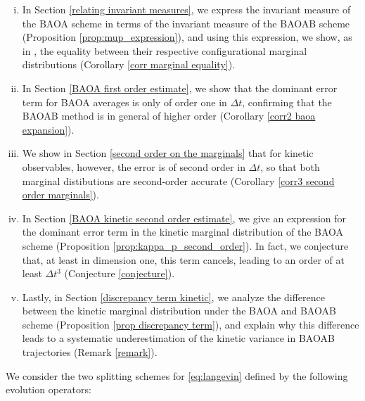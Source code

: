 \begin{enumerate}[(i)]
  \item In Section \ref{relating invariant measures}, we express the invariant measure of the BAOA scheme in terms of the invariant measure of the BAOAB scheme (Proposition \ref{prop:mup_expression}), and using this expression, we show, as in \cite[Section II.C]{KK22}, the equality between their respective configurational marginal distributions (Corollary \ref{corr marginal equality}). 
  \item In Section \ref{BAOA first order estimate}, we show that the dominant error term for BAOA averages is only of order one in $\Delta t$, confirming that the BAOAB method is in general of higher order (Corollary \ref{corr2 baoa expansion}). 
  \item We show in Section \ref{second order on the marginals} that for kinetic observables, however, the error is of second order in $\Delta t$, so that both marginal distibutions are second-order accurate (Corollary \ref{corr3 second order marginals}). 
  \item In Section \ref{BAOA kinetic second order estimate}, we give an expression for the dominant error term in the kinetic marginal distribution of the BAOA scheme (Proposition \ref{prop:kappa_p_second_order}). In fact, we conjecture that, at least in dimension one, this term cancels, leading to an order of at least $\Delta t^3$ (Conjecture \ref{conjecture}).
  \item Lastly, in Section \ref{discrepancy term kinetic}, we analyze the difference between the kinetic marginal distribution under the BAOA and BAOAB scheme (Proposition \ref{prop discrepancy term}), and explain why this difference leads to a systematic underestimation of the kinetic variance in BAOAB trajectories (Remark \ref{remark}).
\end{enumerate}

We consider the two splitting schemes for \eqref{eq:langevin} defined by the following evolution operators:

